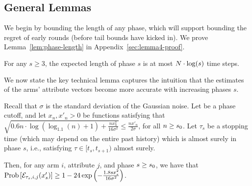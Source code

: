 \subsection{General Lemmas}





We begin by bounding the length of any phase, which will support bounding
the regret of early rounds
(before tail bounds have kicked in). We prove Lemma~\ref{lem:phase-length} in Appendix~\ref{sec:lemma4-proof}.


\begin{lemma} \label{lem:phase-length}
For any $s\geq 3$, the expected length of phase $s$ is at most
$N \cdot \log(s)$ time steps.
\end{lemma}
                  
We now state the key technical lemma captures the intuition that
the estimates of the arms' attribute vectors become
more accurate with increasing phases $s$.

\begin{lemma} \label{lem:round-prob}
Recall that $\sigma$ is the standard deviation of the Gaussian noise.
Let \LatePhase be a phase cutoff, 
and let $x_n, x'_n > 0$ be functions satisfying that
$\sqrt{0.6 n \cdot \log (\log_{1.1}(n) + 1) + \frac{n x_n^2}{16 \sigma^2}}
\leq \frac{n x'_n}{2 \sigma}$,
for all $n \geq s_0$.
Let $\tau_s$ be a stopping time
(which may depend on the entire past history)
which is almost surely in phase $s$,
i.e., satisfying $\tau \in [t_s, t_{s+1})$ almost surely.

Then, for any arm $i$, attribute $j$, and phase $s \geq s_0$,
we have that
$\Prob{\AccE{\tau_s}{i}{j}{x'_s}}
\geq 1 - 24 \exp\left(-\frac{1.8 s x_s^2}{16 \sigma^2} \right)$.
\end{lemma}

